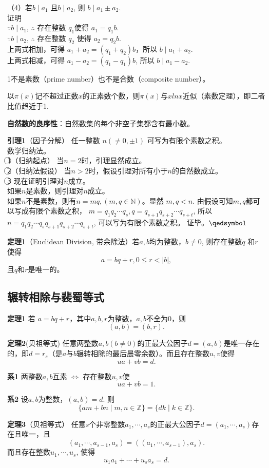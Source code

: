 （4）若$b\mid a_1$ 且$b\mid a_2$, 则 $b\mid a_1\pm a_2$.\\
证明\\
$\because b\mid a_1$, $\therefore$ 存在整数 $q_1$使得 $a_1 = q_1b$.\\
$\because b\mid a_2$, $\therefore$ 存在整数 $q_2$ 使得 $a_2 = q_2b$.\\
上两式相加，可得 $a_1+a_2=(q_1+q_2)b$，所以 $b\mid a_1+a_2$.\\
上两式相减，可得 $a_1-a_2=(q_1-q_1)b$, 所以 $b\mid a_1-a_2$.

1不是素数（prime number）也不是合数（composite number）。

以$\pi(x)$记不超过正数$x$的正素数个数，则$\pi(x)$与$xln x$近似（素数定理），即二者比值趋近于1.

\textbf{自然数的良序性}：自然数集的每个非空子集都含有最小数。

\textbf{引理1}（因子分解） 任一整数 $n(\neq 0, \pm 1)$ 可写为有限个素数之积。\\
数学归纳法。\\
\textcircled{1}（归纳起点） 当$n=2$时，引理显然成立。\\
\textcircled{2}（归纳法假设） 当$n>2$时，假设引理对所有小于$n$的自然数成立。\\
\textcircled{3} 现在证明引理对$n$成立。\\
如果$n$是素数，则引理对$n$成立。\\
如果$n$不是素数，则有$n=mq, (m,q\in \mathbb{N})$。显然 $m,q<n$. 由假设可知$m,q$都可以写成有限个素数之积，
$m=q_1q_2\cdots q_s, q=q_{s+1}q_{s+2}\cdots q_{s+t}$, 
所以$n=q_1q_2\cdots q_s q_{s+1}q_{s+2}\cdots q_{s+t}$, 可以写为有限个素数之积。
证毕。$\hfill\qedsymbol$

\textbf{定理1}（Euclidean Division, 带余除法）若$a, b$均为整数，$b\neq 0$, 则存在整数$q$ 和$r$ 使得
\[
    a=bq+r, 0\leq r<|b|,
\]
且$q$和$r$是唯一的。

\subsection{辗转相除与裴蜀等式}
\textbf{定理1} 若 $a=bq+r$，其中$a, b, r$为整数，$a, b$不全为0，则
\[
    (a,b)=(b,r).
\]

\textbf{定理2}(贝祖等式) 任意两整数$a,b(b\neq 0)$的正最大公因子$d=(a,b)$是唯一存在的，即$d=r_s$（是$a$与$b$辗转相除的最后晨零余数）。而且存在整数$u,v$使得
\[ua+vb=d. \]

\textbf{系1} 两整数$a,b$互素 $\Leftrightarrow$ 存在整数$u,v$使
\[ua+vb=1. \]

\textbf{系2} 设$a,b$为整数，$(a,b)=d$. 则
\[
    \{am+bn\mid m, n\in \mathbb{Z}\} = \{dk\mid k\in \mathbb{Z}\}.
\]

\textbf{定理3}（贝祖等式） 任意$s$个非零整数$a_1, \cdots, a_s$的正最大公因子$d=(a_1, \cdots, a_s)$存在且唯一，且
\[
    (a_1, \cdots, a_{s-1}, a_s)=((a_1, \cdots, a_{s-1}), a_s).
\]
而且存在整数$u_1,\cdots, u_s$, 使得
\[
    u_1a_1+\cdots +u_sa_s=d.
\]


